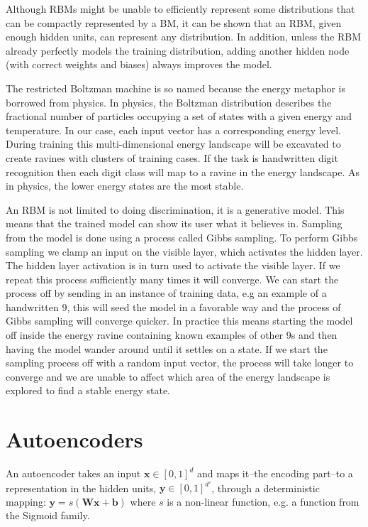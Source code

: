 \documentclass[11pt]{article}
\begin{document}
Although RBMs might be unable to efficiently represent some distributions that can be compactly represented by a BM, it can be shown that an RBM, given enough hidden units, can represent any distribution\cite{le08}.  In addition, unless the RBM already perfectly models the training distribution, adding another hidden node (with correct weights and biases) always improves the model\cite{le08}.

The restricted Boltzman machine is so named because the energy metaphor is borrowed from physics.  In physics, the Boltzman distribution describes the fractional number of particles occupying a set of states with a given energy and temperature.  In our case, each input vector has a corresponding energy level.  During training this multi-dimensional energy landscape will be excavated to create ravines with clusters of training cases.  If the task is handwritten digit recognition then each digit class will map to a ravine in the energy landscape.  As in physics, the lower energy states are the most stable.

An RBM is not limited to doing discrimination, it is a generative model.  This means that the trained model can show its user what it believes in.  Sampling from the model is done using a process called Gibbs sampling.  To perform Gibbs sampling we clamp an input on the visible layer, which activates the hidden layer.  The hidden layer activation is in turn used to activate the visible layer.  If we repeat this process sufficiently many times it will converge.  We can start the process off by sending in an instance of training data, e.g an example of a handwritten 9, this will seed the model in a favorable way and the process of Gibbs sampling will converge quicker.  In practice this means starting the model off inside the energy ravine containing known examples of other 9s and then having the model wander around until it settles on a state.  If we start the sampling process off with a random input vector, the process will take longer to converge and we are unable to affect which area of the energy landscape is explored to find a stable energy state.

\section{Autoencoders}

An autoencoder takes an input $\mathbf{x} \in [0,1]^d$ and maps it--the encoding part--to a representation in the hidden units, $\mathbf{y} \in [0,1]^{d'}$, through a deterministic mapping:
 $\mathbf{y} = s(\mathbf{W}\mathbf{x} + \mathbf{b})$ where $s$ is a non-linear function, e.g. a function from the Sigmoid family.
\end{document}
